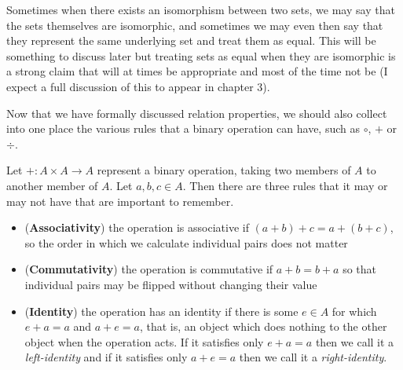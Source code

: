 \documentclass[11pt]{article}
\begin{document}
Sometimes when there exists an isomorphism between two sets, we may say that the sets themselves are isomorphic, and sometimes we may even then say that they represent the same underlying set and treat them as equal. This will be something to discuss later but treating sets as equal when they are isomorphic is a strong claim that will at times be appropriate and most of the time not be (I expect a full discussion of this to appear in chapter 3).

Now that we have formally discussed relation properties, we should also collect into one place the various rules that a binary operation can have, such as $\circ$, $+$ or $\div$.

\begin{definition}
Let $+ \colon A \times A \to A$ represent a binary operation, taking two members of $A$ to another member of $A$. Let $a,b,c \in A$. Then there are three rules that it may or may not have that are important to remember. \begin{itemize}
\item (\textbf{Associativity}) the operation is associative if $(a + b) + c = a + (b + c)$, so the order in which we calculate individual pairs does not matter
\item (\textbf{Commutativity}) the operation is commutative if $a + b = b + a$ so that individual pairs may be flipped without changing their value
\item (\textbf{Identity}) the operation has an identity if there is some $e \in A$ for which $e + a = a$ and $a + e = a$, that is, an object which does nothing to the other object when the operation acts. If it satisfies only $e + a = a$ then we call it a \emph{left-identity} and if it satisfies only $a + e = a$ then we call it a \emph{right-identity}.
\end{itemize}
\end{definition}
\end{document}
